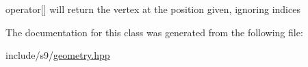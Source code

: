 operator\mbox{[}\mbox{]} will return the vertex at the position given, ignoring indices 

\-The documentation for this class was generated from the following file\-:\begin{DoxyCompactItemize}
\item 
include/s9/\hyperlink{geometry_8hpp}{geometry.\-hpp}\end{DoxyCompactItemize}
